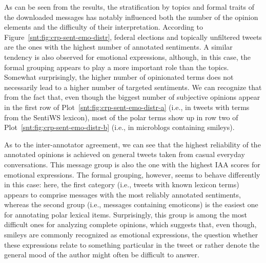 As can be seen from the results, the stratification by topics and
formal traits of the downloaded messages has notably influenced both
the number of the opinion elements and the difficulty of their
interpretation.  According to Figure~\ref{snt:fig:crp-sent-emo-distr},
federal elections and topically unfiltered tweets are the ones with
the highest number of annotated sentiments.  A similar tendency is
also observed for emotional expressions, although, in this case, the
formal grouping appears to play a more important role than the topics.
Somewhat surprisingly, the higher number of opinionated terms does not
necessarily lead to a higher number of targeted sentiments.  We can
recognize that from the fact that, even though the biggest number of
subjective opinions appear in the first row of
Plot~\ref{snt:fig:crp-sent-emo-distr-a} (i.e., in tweets with terms
from the SentiWS lexicon), most of the polar terms show up in row two
of Plot~\ref{snt:fig:crp-sent-emo-distr-b} (i.e., in microblogs
containing smileys).

As to the inter-annotator agreement, we can see that the highest
reliability of the annotated opinions is achieved on general tweets
taken from casual everyday conversations.  This message group is also
the one with the highest IAA scores for emotional expressions.  The
formal grouping, however, seems to behave differently in this case:
here, the first category (i.e., tweets with known lexicon terms)
appears to comprise messages with the most reliably annotated
sentiments, whereas the second group (i.e., messages containing
emoticons) is the easiest one for annotating polar lexical items.
Surprisingly, this group is among the most difficult ones for
analyzing complete opinions, which suggests that, even though, smileys
are commonly recognized as emotional expressions, the question whether
these expressions relate to something particular in the tweet or
rather denote the general mood of the author might often be difficult
to answer.

